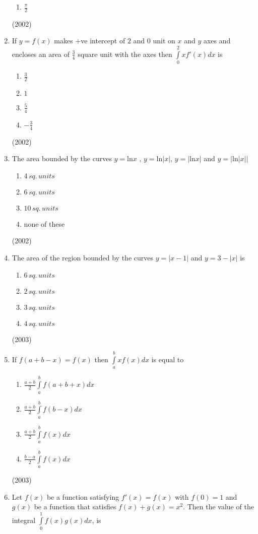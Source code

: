 \documentclass[journal,12pt,twocolumn]{IEEEtran}
\theoremstyle{remark}
\begin{document}
\begin{enumerate}
\begin{enumerate}
					\item $\frac{\pi}{2}$
			\end{enumerate}
			\hfill (2002)
	\item
	If $y=f(x)$ makes +ve intercept of $2$ and $0$ unit on $x$ and $y$ axes and encloses an area of $\frac{3}{4}$ square unit with the axes then $\int \limits_0^2 x f'(x)dx$ is
			\begin{enumerate}
				\item $\frac{3}{2}$
				\item $1$
				\item $\frac{5}{4}$
				\item $-\frac{3}{4}$
			\end{enumerate}
			\hfill (2002)
	\item
		The area bounded by the curves $y= \mathrm{ln} x$ , $y= \mathrm{ln} |x|$, $y=|\mathrm{ln}x|$ and $y=| \mathrm{ln} |x||$
			\begin{enumerate}
					\item $4 \, sq. \, units$
					\item $6 \, sq. \, units$
					\item $10 \, sq. \, units$
					\item none of these
			\end{enumerate}
			\hfill(2002)
	\item
		The area of the region bounded by the curves $y= |x-1|$ and $y=3-|x|$ is
			\begin {enumerate}
				\item $6 \, sq. \, units$
				\item $2 \, sq. \, units$
				\item $3 \, sq. \, units$
				\item $4 \, sq. \, units$
			\end {enumerate}
			\hfill (2003)
	\item
		If $f(a+b-x)=f(x)$ then $\int \limits_a^b xf(x)dx$ is equal to
			\begin {enumerate}
				\item $\frac{a+b}{2} \int \limits_a^b f(a+b+x)dx$
				\item $\frac{a+b}{2} \int \limits_a^b f(b-x)dx$
				\item $\frac{a+b}{2} \int \limits_a^b f(x)dx$
				\item $\frac{b-a}{2} \int \limits_a^b f(x)dx$
			\end {enumerate}
			\hfill (2003)
	\item 
		Let $f(x)$ be a function satisfying $f'(x) = f(x)$ with $f(0)=1$ and $g(x)$ be a function that satisfies $f(x) + g(x)=x^2$. Then the value of the integral $\int \limits_0^1 f(x)g(x)dx$, is

\end{enumerate}
\end{document}
